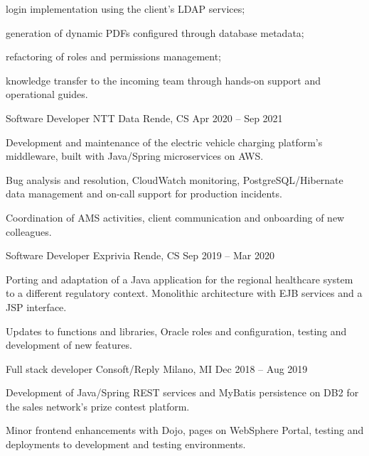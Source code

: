 \documentclass[]{style}
\begin{document}
\begin{cventries}
{\begin{cventryparagraph}
    	{\begin{cventryparagraphlist}
    		\item {login implementation using the client's LDAP services;}
    		\item {generation of dynamic PDFs configured through database metadata;}
    		\item {refactoring of roles and permissions management;}
    		\item {knowledge transfer to the incoming team through hands-on support and operational guides.}
    	\end{cventryparagraphlist}}
	\end{cventryparagraph}}
	\cventry
	{Software Developer}
	{NTT Data}
	{Rende, CS}
	{Apr 2020 -- Sep 2021}
	{\begin{cventryparagraph}
		\item {}
		\item {Development and maintenance of the electric vehicle charging platform's middleware, built with Java/Spring microservices on AWS.}
		\item {Bug analysis and resolution, CloudWatch monitoring, PostgreSQL/Hibernate data management and on-call support for production incidents.}
		\item {Coordination of AMS activities, client communication and onboarding of new colleagues.}
	\end{cventryparagraph}}
	\cventry
	{Software Developer}
	{Exprivia}
	{Rende, CS}
	{Sep 2019 -- Mar 2020}
	{\begin{cventryparagraph}
		\item {\cvprojectheading{SISR Edotto}{}}
		\item {Porting and adaptation of a Java application for the regional healthcare system to a different regulatory context. Monolithic architecture with EJB services and a JSP interface.}
		\item {Updates to functions and libraries, Oracle roles and configuration, testing and development of new features.}
	\end{cventryparagraph}}
	\cventry
	{Full stack developer}
	{Consoft/Reply}
	{Milano, MI}
	{Dec 2018 -- Aug 2019}
	{\begin{cventryparagraph}
		\item {\cvprojectheading{UnipolSai Contest}{}}
		\item {Development of Java/Spring REST services and MyBatis persistence on DB2 for the sales network's prize contest platform.}
		\item {Minor frontend enhancements with Dojo, pages on WebSphere Portal, testing and deployments to development and testing environments.}
	\end{cventryparagraph}}
\end{cventries}
\end{document}
